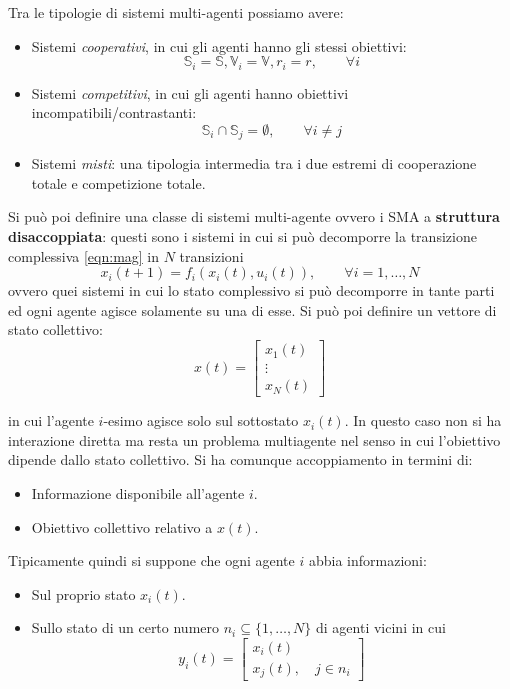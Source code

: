 Tra le tipologie di sistemi multi-agenti possiamo avere:
\begin{itemize}
\item Sistemi \textit{cooperativi}, in cui gli agenti hanno gli stessi obiettivi:
  \begin{equation}
  \mathbb{S}_i = \mathbb{S}, \mathbb{V}_i = \mathbb{V}, r_i = r, \qquad \forall i
  \end{equation}
\item Sistemi \textit{competitivi}, in cui gli agenti hanno obiettivi incompatibili/contrastanti:
  \begin{equation}
  \mathbb{S}_i \cap \mathbb{S}_j = \emptyset, \qquad \forall i \neq j
  \end{equation}
\item Sistemi \textit{misti}: una tipologia intermedia tra i due estremi di cooperazione totale e competizione totale.
\end{itemize}
Si pu\`o poi definire una classe di sistemi multi-agente ovvero i SMA a \textbf{struttura disaccoppiata}: questi sono i sistemi in cui si pu\`o decomporre la transizione complessiva \ref{eqn:mag} in $N$ transizioni
\begin{equation}
    x_i(t+1) = f_i(x_i(t), u_i(t)), \qquad \forall i = 1, \dots, N
\end{equation}
ovvero quei sistemi in cui lo stato complessivo si pu\`o decomporre in tante parti ed ogni agente agisce solamente su una di esse. Si pu\`o poi definire un vettore di stato collettivo:
\begin{equation}
    x(t) = \begin{bmatrix}
    x_1(t) \\
    \vdots \\
    x_N(t)
    \end{bmatrix}
\end{equation}

in cui l'agente $i$-esimo agisce solo sul sottostato $x_i(t)$. In questo caso non si ha interazione diretta ma resta un problema multiagente nel senso in cui l'obiettivo dipende dallo stato collettivo. Si ha comunque accoppiamento in termini di:
\begin{itemize}
    \item Informazione disponibile all'agente $i$.
    \item Obiettivo collettivo relativo a $x(t)$.
\end{itemize}
Tipicamente quindi si suppone che ogni agente $i$ abbia informazioni:
\begin{itemize}
    \item Sul proprio stato $x_i(t)$.
    \item Sullo stato di un certo numero $n_i \subseteq \{1, \dots, N \}$ di agenti vicini in cui
  \begin{equation}
  y_i(t) = \begin{bmatrix}
  x_i(t) \\
  x_j(t), \quad j \in n_i
  \end{bmatrix}
  \end{equation}
\end{itemize}

